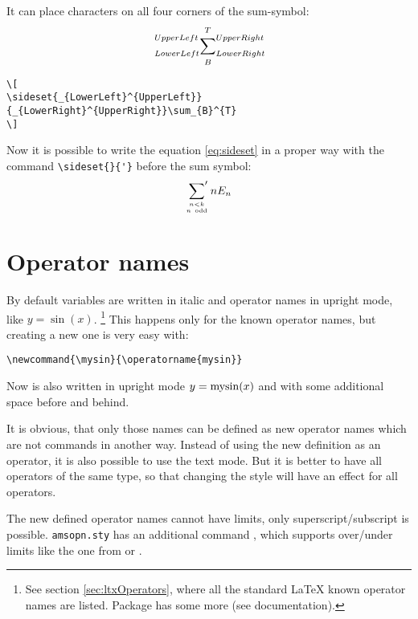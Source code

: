 \begin{table}[htb]
It can place characters on all four corners of the sum-symbol:
\[
\sideset{_{LowerLeft}^{UpperLeft}}{_{LowerRight}^{UpperRight}}\sum_{B}^{T}
\]

\begin{lstlisting}
\[
\sideset{_{LowerLeft}^{UpperLeft}}{_{LowerRight}^{UpperRight}}\sum_{B}^{T}
\]
\end{lstlisting}

Now it is possible to write the equation \ref{eq:sideset} in a proper
way with the command \verb|\sideset{}{'}| before
the sum symbol:
\begin{equation}
\sideset{}{'}\sum_{n<k\atop n\ \textrm{odd}}nE_{n}
\end{equation}


\section{Operator names}\label{OperatorNames}

%
By default variables are written in italic and operator
names in upright mode, like $y=\sin(x)$.%
\footnote{See section \vref{sec:ltxOperators}, where all the standard \LaTeX{}    %
known operator names are listed. Package \AmSmath has
some more (see documentation).} This happens only for the known operator names, but creating a new
one is very easy with:

\begin{lstlisting}
\newcommand{\mysin}{\operatorname{mysin}}
\end{lstlisting}

Now  is also written in upright mode
$y=\mysin(x)$ and with some additional space before and behind.

It is obvious, that only those names can be defined as new operator
names which are not commands in another way. Instead of using the
new definition as an operator, it is also possible to use the text
mode. But it is better to have all operators of the same type, so that
changing the style will have an effect for all operators.

%
The new defined operator names cannot have limits, only
superscript/subscript is possible. \verb+amsopn.sty+ has an additional command
,
which supports over/under limits like the one from 
or .


\end{table}
